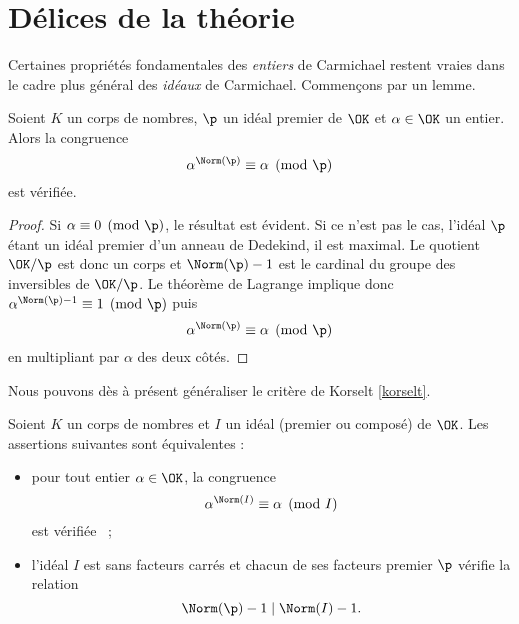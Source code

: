 \section{Délices de la théorie}

Certaines propriétés fondamentales des \emph{entiers} de Carmichael restent vraies dans le cadre plus général des \emph{idéaux} de Carmichael. Commençons par un lemme.

\begin{lemme}\label{identite-1}
	Soient $K$ un corps de nombres, $\p$ un idéal premier de $\OK$ et $\alpha \in \OK$ un entier. Alors la congruence \[\alpha^{\Norm(\p)} \equiv \alpha \pmod{\p}\] est vérifiée.
\end{lemme}

\begin{proof}
	Si $\alpha\equiv 0\pmod{\p}$, le résultat est évident. Si ce n'est pas le cas, l'idéal $\p$ étant un idéal premier d'un anneau de Dedekind, il est maximal. Le quotient $\OK/\p$ est donc un corps et $\Norm(\p) -1$ est le cardinal du groupe des inversibles de $\OK/\p$. Le théorème de Lagrange implique donc $\alpha^{\Norm(\p)-1}\equiv 1 \pmod{\p}$ puis \[\alpha^{\Norm(\p)} \equiv \alpha \pmod{\p}\] en multipliant par $\alpha$ des deux côtés.
\end{proof}

Nous pouvons dès à présent généraliser le critère de Korselt \ref{korselt}.

\begin{theoreme}\label{korselt-generalise}
	Soient $K$ un corps de nombres et $I$ un idéal (premier ou composé) de $\OK$. Les assertions suivantes sont équivalentes :
	\begin{itemize}
		\item pour tout entier $\alpha \in \OK$, la congruence \[\alpha^{\Norm(I)} \equiv \alpha \pmod{I}\] est vérifiée ~;
		\item l'idéal $I$ est sans facteurs carrés et chacun de ses facteurs premier $\p$ vérifie la relation \[\Norm(\p) - 1 \mid \Norm(I) - 1.\]
	\end{itemize}
\end{theoreme}

